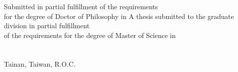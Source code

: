 \begin{minipage}[c][5cm][t]{\textwidth}
  \begin{center}\Large %
  \ifdefined\ForPhD
    Submitted in partial fulfillment of the requirements\\%
    for the degree of Doctor of Philosophy in%
  \else
    A thesis submitted to the graduate division in partial fulfillment\\
    of the requirements for the degree of Master of Science in%
  \fi
  \GetDeptEngName\\%
  \GetCollEngName\\%
  \UniversityNameEng\\%
  Tainan, Taiwan, R.O.C.\\%
  \vspace{0.1cm}
  \GetOralEngDay \thinspace \thinspace \GetThesisMonthInEng \thinspace \thinspace \GetThesisYear%
  \end{center}
\end{minipage}


\vspace{0.8cm}

\begin{minipage}[c][9.0cm][t]{\textwidth}
   \\

  \vspace{0.48cm}

  \DisplayCommitteeSignatureArea
\end{minipage}


\vspace{1.5cm}


\begin{minipage}[c][2.0cm][t]{\textwidth}
  \begin{center}
    \makebox[1em][c]{\Large:}
    \makebox[7.2em][l]{\namesigdate}\\

    \vspace{1.0cm}

    \makebox[1em][c]{\Large:}
    \makebox[7.2em][l]{\namesigdate}\\
  \end{center}
\end{minipage}

\EndOralTemplateDoc
